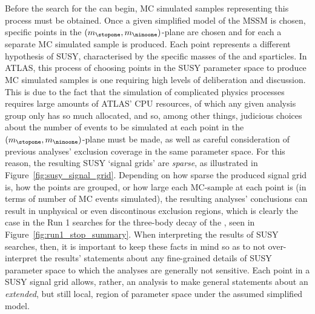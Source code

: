 Before the search for the \stopone can begin, MC simulated samples representing this process
must be obtained.
Once a given simplified model of the MSSM is chosen, specific points in the
$(m_{\stopone}, m_{\ninoone})$-plane are chosen and for each a separate MC simulated
sample is produced.
Each point represents a different hypothesis of SUSY, characterised by the specific masses
of the \stopone and \ninoone sparticles.
In ATLAS, this process of choosing points in the SUSY parameter space to produce MC simulated samples
is one requiring high levels of deliberation and discussion.
This is due to the fact that the simulation of complicated physics processes requires large amounts
of ATLAS' CPU resources, of which any given analysis group only has so much allocated, and so, among other things,
judicious choices about the number of events to be simulated at each point in the $(m_{\stopone}, m_{\ninoone})$-plane
must be made, as well as careful consideration of previous analyses' exclusion coverage in the same parameter space.
For this reason, the resulting SUSY `signal grids' are \textit{sparse}, as illustrated in Figure~\ref{fig:susy_signal_grid}.
Depending on how sparse the produced signal grid is, how the points are grouped, or how large each MC-sample at each
point is (in terms of number of MC events simulated), the resulting analyses' conclusions
can result in unphysical or even discontinous exclusion regions, which is clearly the case in the Run 1 searches
for the three-body decay of the \stopone, seen in Figure~\ref{fig:run1_stop_summary}.
When interpreting the results of SUSY searches, then, it is important to keep these facts in mind
so as to not over-interpret the results' statements about any fine-grained details of SUSY parameter space to
which the analyses are generally not sensitive.
Each point in a SUSY signal grid allows, rather, an analysis to make general statements about
an \textit{extended}, but still local, region of parameter space under the assumed simplified model.


